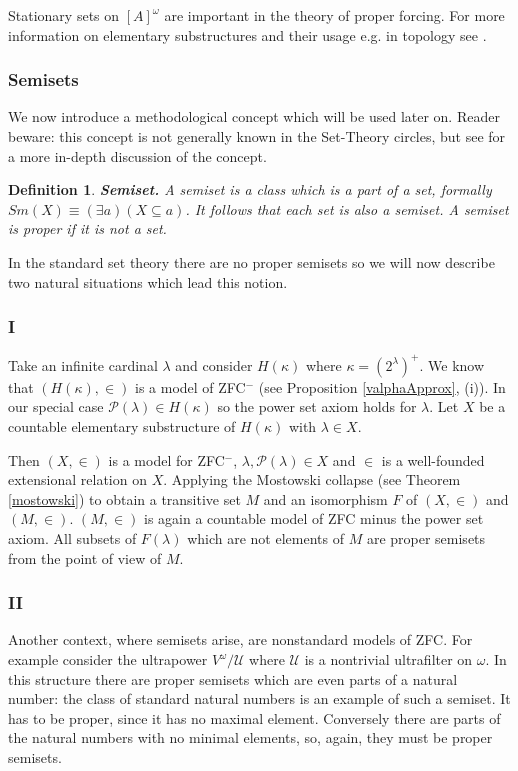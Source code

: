 \documentclass[a4paper,11pt,oneside]{mybook}
\def\pw{{{\mathcal P}}}
\theoremstyle{theorem}
\newtheorem{definition}[subsection]{Definition}
\theoremstyle{example}
\begin{document}
{Stationary sets on $[A]^\omega$ are important in the theory of proper forcing. For more information on elementary substructures
and their usage e.g. in topology see \cite{dow:mstt}.

\subsubsection{Semisets}
We now introduce a methodological concept which will be used later on. Reader beware: this concept is not generally known in the
Set-Theory circles, but see \cite{vopenka:semisets} for a more in-depth discussion of the concept.

\begin{definition}\label{semiset}
{\bf Semiset.} A \emph{semiset} is a class which is a part of a set, formally $Sm(X)\equiv(\exists a)(X\subseteq a)$.
It follows that each set is also a semiset. A semiset is \emph{proper} if it is not a set.
\end{definition}

In the standard set theory there are no proper semisets so we will now describe two natural situations which lead this notion.


\subsubsection{I}


Take an infinite cardinal $\lambda$ and consider $H(\kappa)$ where $\kappa= (2^\lambda)^+$. We know that
$(H(\kappa),\in)$ is a model of ZFC${}^-$ (see Proposition \ref{valphaApprox}, (i)). In our special case
$\pw(\lambda)\in H(\kappa)$ so the power set axiom holds for $\lambda$. Let $X$ be a countable elementary substructure of $H(\kappa)$
with $\lambda\in X$.

Then $(X,\in)$ is a model for ZFC${}^-$, $\lambda,\pw(\lambda)\in X$ and $\in$ is a well-founded extensional relation
on $X$. Applying the Mostowski collapse (see Theorem \ref{mostowski}) to obtain a transitive set $M$ and an isomorphism $F$ of $(X,\in)$
and $(M,\in)$. $(M,\in)$ is again a countable model of ZFC minus the power set axiom. All subsets of $F(\lambda)$ which are not elements
of $M$ are proper semisets from the point of view of $M$.


\subsubsection{II}

Another context, where semisets arise, are nonstandard models of ZFC. For example consider the ultrapower $V^\omega/{\mathcal U}$
where ${\mathcal U}$ is a nontrivial ultrafilter on $\omega$. In this structure there are proper semisets which are even parts of a natural number:
the class of standard natural numbers is an example of such a semiset. It has to be proper, since it has no maximal element. Conversely there
are parts of the natural numbers with no minimal elements, so, again, they must be proper semisets.

}
\end{document}
